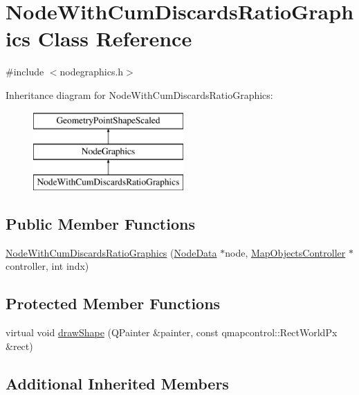 \hypertarget{class_node_with_cum_discards_ratio_graphics}{}\section{Node\+With\+Cum\+Discards\+Ratio\+Graphics Class Reference}
\label{class_node_with_cum_discards_ratio_graphics}


{\ttfamily \#include $<$nodegraphics.\+h$>$}

Inheritance diagram for Node\+With\+Cum\+Discards\+Ratio\+Graphics\+:\begin{figure}[H]
\begin{center}
\leavevmode
\includegraphics[height=3.000000cm]{d3/d8e/class_node_with_cum_discards_ratio_graphics}
\end{center}
\end{figure}
\subsection*{Public Member Functions}
\begin{DoxyCompactItemize}
\item 
\mbox{\hyperlink{class_node_with_cum_discards_ratio_graphics_a883dab295c7ace76665c29b6d43c839c}{Node\+With\+Cum\+Discards\+Ratio\+Graphics}} (\mbox{\hyperlink{class_node_data}{Node\+Data}} $\ast$node, \mbox{\hyperlink{class_map_objects_controller}{Map\+Objects\+Controller}} $\ast$controller, int indx)
\end{DoxyCompactItemize}
\subsection*{Protected Member Functions}
\begin{DoxyCompactItemize}
\item 
virtual void \mbox{\hyperlink{class_node_with_cum_discards_ratio_graphics_afd548bf7f8e48643feeed76894e256e6}{draw\+Shape}} (Q\+Painter \&painter, const qmapcontrol\+::\+Rect\+World\+Px \&rect)
\end{DoxyCompactItemize}
\subsection*{Additional Inherited Members}


